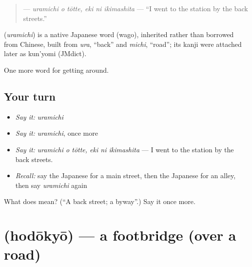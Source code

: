 \begin{quote}
\textbf{  } — \emph{uramichi o tōtte, eki ni ikimashita} — \textquotedblleft{}I went to the station by the back streets.\textquotedblright{}
\end{quote}

\begin{cousinweb}
\textbf{} (\emph{uramichi}) is a native Japanese word (wago), inherited rather than borrowed from Chinese, built from \emph{ura}, \textquotedblleft{}back\textquotedblright{} and \emph{michi}, \textquotedblleft{}road\textquotedblright{}; its kanji were attached later as kun'yomi (JMdict).
\end{cousinweb}

\begin{grammarlens}[title={What you've built}]
One more word for getting around.
\end{grammarlens}

\subsection*{Your turn}
\begin{itemize}
\raggedright
  \item \emph{Say it:} \emph{uramichi}
  \item \emph{Say it:} \emph{uramichi}, once more
  \item \emph{Say it:} \emph{uramichi o tōtte, eki ni ikimashita} — I went to the station by the back streets.
  \item \emph{Recall:} say the Japanese for a main street, then the Japanese for an alley, then say \emph{uramichi} again
\end{itemize}

\begin{tcolorbox}[breakable,colback=teal!4,colframe=teal!35!black,title={Before you move on}]
What does  mean? (\textquotedblleft{}A back street; a byway\textquotedblright{}.) Say it once more.
\end{tcolorbox}
\section[\texorpdfstring{\ja{ほどうきょう} (hodōkyō)}{ほどうきょう (hodōkyō)}]{ (hodōkyō) — a footbridge (over a road)}

\label{lesson:JA-C389-hodoukyou}



